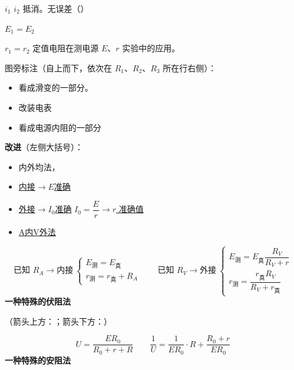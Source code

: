 $i_1$ $i_2$ 抵消。无误差（）

$E_1=E_2$

$r_1=r_2$
定值电阻在测电源 $E$、$r$ 实验中的应用。


图旁标注（自上而下，依次在 $R_1$、$R_2$、$R_3$ 所在行右侧）：
\begin{itemize}
\item 看成滑变的一部分。
\item 改装电表
\item 看成电源内阻的一部分
\end{itemize}
\textbf{改进}（左侧大括号）：
\begin{itemize}
\item 内外均法，
\item \underline{内接$\to E$准确} %
\item \underline{外接$\to I_0$准确} \quad \underline{$I_0=\dfrac{E}{r}\to r$ 准确值} %
\item \underline{A内V外法} %
\end{itemize}
\[
\text{已知 }R_A\to\text{内接}\
\left\{\begin{array}{l} E_{\text{测}}=E_{\text{真}}\\ r_{\text{测}}=r_{\text{真}}+R_A \end{array}\right.
\qquad
\text{已知 }R_V\to\text{外接}\
\left\{\begin{array}{l} E_{\text{测}}=E_{\text{真}}\dfrac{R_V}{R_V+r}\\[8pt] r_{\text{测}}=\dfrac{r_{\text{真}}R_V}{R_V+r_{\text{真}}} \end{array}\right.
\]
\textbf{一种特殊的伏阻法}


（箭头上方：；箭头下方：）

\[
U=\frac{E R_0}{R_0+r+R}
\qquad
\frac{1}{U}=\frac{1}{ER_0}\cdot R+\frac{R_0+r}{ER_0}
\]
\textbf{一种特殊的安阻法}

